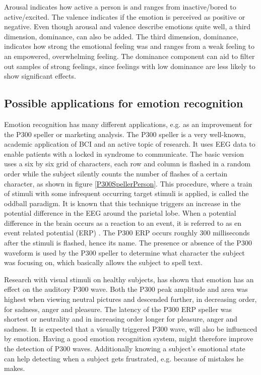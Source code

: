 \npar

 Arousal indicates how active a person is and ranges from inactive/bored to active/excited. The valence indicates if the emotion is perceived as positive or negative. Even though arousal and valence describe emotions quite well, a third dimension, dominance, can also be added. The third dimension, dominance, indicates how strong the emotional feeling was and ranges from a weak feeling to an empowered, overwhelming feeling. The dominance component can aid to filter out samples of strong feelings, since feelings with low dominance are less likely to show significant effects.


\subsection{Possible applications for emotion recognition}
Emotion recognition has many different applications, e.g. as an improvement for the P300 speller or marketing analysis. The P300 speller is a very well-known, academic application of BCI and an active topic of research. It uses EEG data to enable patients with a locked in syndrome to communicate\cite{P300Origin}. The basic version uses a six by six grid of characters, each row and column is flashed in a random order while the subject silently counts the number of flashes of a certain character, as shown in figure \ref{P300SpellerPerson}. This procedure, where a train of stimuli with some infrequent occurring target stimuli is applied, is called the oddball paradigm\cite{PaperThibault}. It is known that this technique triggers an increase in the potential difference in the EEG around the parietal lobe. When a potential difference in the brain occurs as a reaction to an event, it is referred to as en event related potential (ERP) . The P300 ERP occurs roughly 300 milliseconds after the stimuli is flashed, hence its name\citep{ComparisonClassifications}. The presence or absence of the P300 waveform is used by the P300 speller to determine what character the subject was focusing on, which basically allows the subject to spell text. 


Research with visual stimuli on healthy subjects, has shown that emotion has an effect on the auditory P300 wave\cite{AuditoryP300Effect}. Both the P300 peak amplitude and area was highest when viewing neutral pictures and descended further, in decreasing order, for sadness, anger and pleasure. The latency of the P300 ERP speller was shortest or neutrality and in increasing order longer for pleasure, anger and sadness. It is expected that a visually triggered P300 wave, will also be influenced by emotion. Having a good emotion recognition system, might therefore improve the detection of P300 waves. Additionally knowing a subject's emotional state can help detecting when a subject gets frustrated, e.g. because of mistakes he makes.

